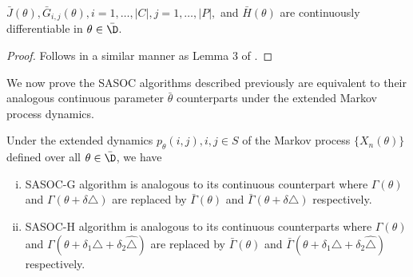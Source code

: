 \documentclass[11pt,letterpaper,english]{article}
\begin{document}
\begin{lemma}
$\bar J(\theta), \bar G_{i,j}(\theta), i=1,\ldots,|C|, j=1,\ldots,|P|,$ and $\bar H(\theta)$ are continuously differentiable in $\theta \in \bar \D$.
\end{lemma}
\begin{proof}
    Follows in a similar manner as Lemma 3 of \cite{shalabh2011stochastic}.
\end{proof}

We now prove the SASOC algorithms described previously are equivalent to their analogous continuous parameter $\bar\theta$ counterparts under the extended Markov process dynamics.
 
\begin{lemma}
\label{lemma:sasocequivalence}
Under the extended dynamics $p_\theta(i,j),i,j \in S$ of the Markov process $\{X_n(\theta)\}$ defined over all $\theta \in \bar \D$, we have
\begin{enumerate}[(i)]
    \item SASOC-G algorithm is analogous to its continuous counterpart where $\Gamma(\theta)$ and $\Gamma(\theta + \delta \triangle)$ are replaced by $\bar\Gamma(\theta)$ and $\bar\Gamma(\theta + \delta \triangle)$ respectively.
    \item SASOC-H algorithm is analogous to its continuous counterparts where $\Gamma(\theta)$ and $\Gamma(\theta + \delta_1 \triangle + \delta_2 \hat\triangle)$ are replaced by $\bar\Gamma(\theta)$ and $\bar\Gamma(\theta +\delta_1 \triangle + \delta_2 \hat\triangle)$ respectively.
\end{enumerate}

\end{lemma}
\end{document}
